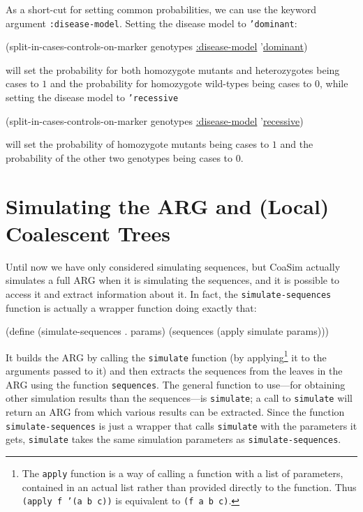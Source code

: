 \documentclass{manual}
\begin{document}
As a short-cut for setting common probabilities, we can use the
keyword argument \texttt{:disease-model}.  Setting the disease model
to \texttt{'dominant}:
\begin{code}
(split-in-cases-controls-on-marker genotypes \underline{:disease-model} '\underline{dominant})
\end{code}
will set the probability for both homozygote mutants and heterozygotes
being cases to $1$ and the probability for homozygote wild-types being
cases to $0$, while setting the disease model to \texttt{'recessive}
\begin{code}
(split-in-cases-controls-on-marker genotypes \underline{:disease-model} '\underline{recessive})
\end{code}
will set the probability of homozygote mutants being cases to $1$ and
the probability of the other two genotypes being cases to $0$.



\section{Simulating the ARG and (Local) Coalescent Trees}
\label{sec:simul-coal-trees}

Until now we have only considered simulating sequences, but CoaSim
actually simulates a full ARG when it is simulating the sequences, and
it is possible to access it and extract information about it.  In
fact, the \texttt{simulate-sequences} function is actually a wrapper
function doing exactly that:
\begin{code}
(define (simulate-sequences . params)
  (sequences (apply simulate params)))
\end{code}
It builds the ARG by calling the \texttt{simulate} function (by
applying\footnote{The \texttt{apply} function is a way of
  calling a function with a list of parameters, contained in an actual
  list rather than provided directly to the function.  Thus
  \texttt{(apply f '(a b c))} is equivalent to \texttt{(f a b c)}.} it
to the arguments passed to it) and then extracts the sequences from
the leaves in the ARG using the function \texttt{sequences}.  The
general function to use---for obtaining other simulation results than
the sequences---is \texttt{simulate}; a call to \texttt{simulate} will
return an ARG from which various results can be extracted.  Since the
function \texttt{simulate-sequences} is just a wrapper that calls
\texttt{simulate} with the parameters it gets, 
\texttt{simulate} takes the same simulation parameters as
\texttt{simulate-sequences}.
\end{document}
